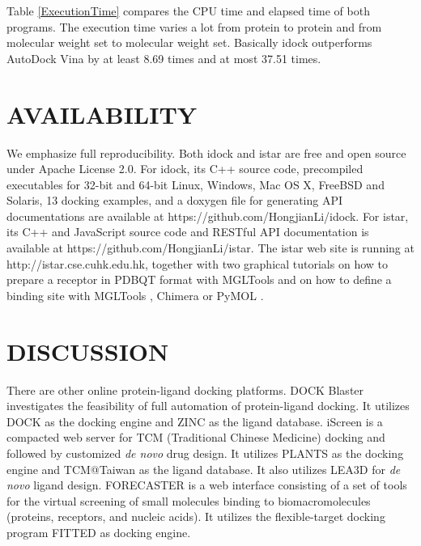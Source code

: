 \documentclass[12pt]{article}
\begin{document}
Table \ref{ExecutionTime} compares the CPU time and elapsed time of both programs. The execution time varies a lot from protein to protein and from molecular weight set to molecular weight set. Basically idock outperforms AutoDock Vina by at least 8.69 times and at most 37.51 times.

\section*{\sffamily \Large AVAILABILITY}

We emphasize full reproducibility. Both idock and istar are free and open source under Apache License 2.0. For idock, its C++ source code, precompiled executables for 32-bit and 64-bit Linux, Windows, Mac OS X, FreeBSD and Solaris, 13 docking examples, and a doxygen file for generating API documentations are available at https://github.com/HongjianLi/idock. For istar, its C++ and JavaScript source code and RESTful API documentation is available at https://github.com/HongjianLi/istar. The istar web site is running at http://istar.cse.cuhk.edu.hk, together with two graphical tutorials on how to prepare a receptor in PDBQT format with MGLTools \citep{596} and on how to define a binding site with MGLTools \citep{596}, Chimera \citep{1219} or PyMOL \citep{1221}.

\section*{\sffamily \Large DISCUSSION}

There are other online protein-ligand docking platforms. DOCK Blaster \citep{557} investigates the feasibility of full automation of protein-ligand docking. It utilizes DOCK \citep{1222} as the docking engine and ZINC \citep{532,1178} as the ligand database. iScreen \citep{899} is a compacted web server for TCM (Traditional Chinese Medicine) docking and followed by customized \textit{de novo} drug design. It utilizes PLANTS \citep{610,607,779} as the docking engine and TCM@Taiwan \citep{528} as the ligand database. It also utilizes LEA3D \citep{1223} for \textit{de novo} ligand design. FORECASTER \citep{1012} is a web interface consisting of a set of tools for the virtual screening of small molecules binding to biomacromolecules (proteins, receptors, and nucleic acids). It utilizes the flexible-target docking program FITTED \citep{602} as docking engine.
\end{document}
